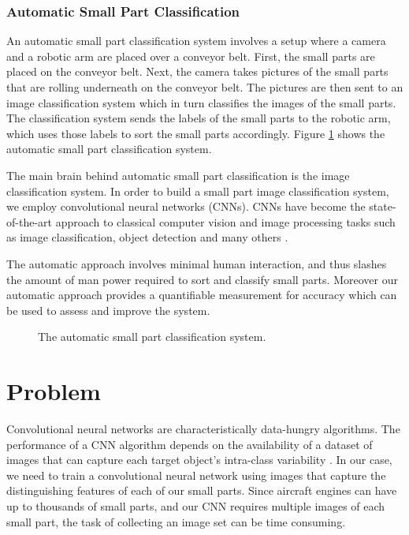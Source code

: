 \subsubsection{Automatic Small Part Classification}

An automatic small part classification system involves a setup where a camera and a robotic arm are placed over a conveyor belt. First, the small parts are placed on the conveyor belt. Next, the camera takes pictures of the small parts that are rolling underneath on the conveyor belt. The pictures are then sent to an image classification system which in turn classifies the images of the small parts. The classification system sends the labels of the small parts to the robotic arm, which uses those labels to sort the small parts accordingly. Figure \ref{fig:automatic_system} shows the automatic small part classification system.

The main brain behind automatic small part classification is the image classification system. In order to build a small part image classification system, we employ convolutional neural networks (CNNs). CNNs have become the state-of-the-art approach to classical computer vision and image processing tasks such as image classification, object detection and many others \cite{ILSVRC15}.

The automatic approach involves minimal human interaction, and thus slashes the amount of man power required to sort and classify small parts. Moreover our automatic approach provides a quantifiable measurement for accuracy which can be used to assess and improve the system.

\begin{figure}[H]
\centering
{}
\caption{The automatic small part classification system.}
\label{fig:automatic_system}
\end{figure}


\section{Problem}

Convolutional neural networks are characteristically data-hungry algorithms. The performance of a CNN algorithm depends on the availability of a dataset of images that can capture each target object's intra-class variability \cite{krizhevsky2012imagenet}. In our case, we need to train a convolutional neural network using images that capture the distinguishing features of each of our small parts. Since aircraft engines can have up to thousands of small parts, and our CNN requires multiple images of each small part, the task of collecting an image set can be time consuming.

